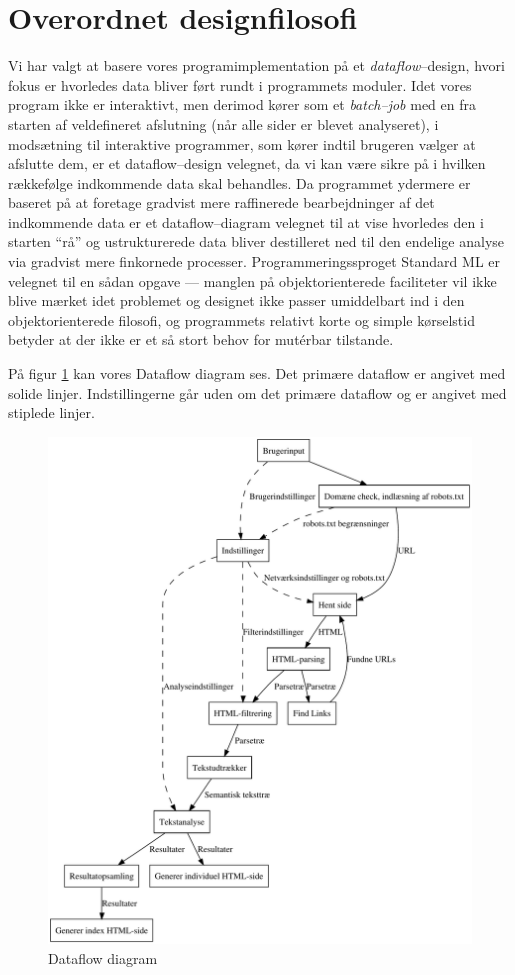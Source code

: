 \documentclass[a4paper,oneside]{memoir}
\begin{document}
\section{Overordnet designfilosofi}
\label{overordnetdesign}
Vi har valgt at basere vores programimplementation på et
\textit{dataflow}--design, hvori fokus er hvorledes data bliver ført
rundt i programmets moduler. Idet vores program ikke er interaktivt,
men derimod kører som et \textit{batch--job} med en fra starten af
veldefineret afslutning (når alle sider er blevet analyseret), i
modsætning til interaktive programmer, som kører indtil brugeren
vælger at afslutte dem, er et dataflow--design velegnet, da vi kan
være sikre på i hvilken rækkefølge indkommende data skal behandles. Da
programmet ydermere er baseret på at foretage gradvist mere
raffinerede bearbejdninger af det indkommende data er et
dataflow--diagram velegnet til at vise hvorledes den i starten ``rå''
og ustrukturerede data bliver destilleret ned til den endelige analyse
via gradvist mere finkornede processer. Programmeringssproget Standard
ML er velegnet til en sådan opgave --- manglen på objektorienterede
faciliteter vil ikke blive mærket idet problemet og designet ikke
passer umiddelbart ind i den objektorienterede filosofi, og
programmets relativt korte og simple kørselstid betyder at der ikke er
et så stort behov for mutérbar tilstande. 

På figur \ref{dataflowdia} kan vores Dataflow diagram ses. Det primære
dataflow er angivet med solide linjer. Indstillingerne går uden om det
primære dataflow og er angivet med stiplede linjer.
\begin{figure}
  \includegraphics[width=\textwidth]{endeligtdesignill.pdf}
  \caption{Dataflow diagram}
  \label{dataflowdia}
\end{figure}
\end{document}
